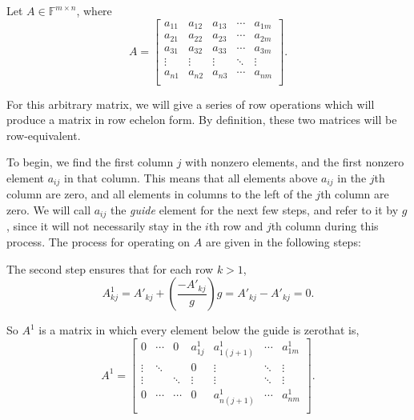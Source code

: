 \documentclass[12pt]{article}
\newcommand{\F}{\mathbb{F}}
\begin{document}
Let $A\in\F^{m\times n}$, where
\[A =
    \begin{bmatrix}
        a_{11} & a_{12} & a_{13} & \cdots & a_{1m} \\
        a_{21} & a_{22} & a_{23} & \cdots & a_{2m} \\
        a_{31} & a_{32} & a_{33} & \cdots & a_{3m} \\
        \vdots & \vdots & \vdots & \ddots & \vdots \\
        a_{n1} & a_{n2} & a_{n3} & \cdots & a_{nm} \\
    \end{bmatrix}
.\]

For this arbitrary matrix, we will give a series of row operations which will produce a matrix in row echelon form. By definition, these two matrices will be row-equivalent. 

To begin, we find the first column $j$ with nonzero elements, and the first nonzero element $a_{ij}$ in that column. This means that all elements above $a_{ij}$ in the $j$th column are zero, and all elements in columns to the left of the $j$th column are zero. We will call $a_{ij}$ the \emph{guide} element for the next few steps, and refer to it by $g$, since it will not necessarily stay in the $i$th row and $j$th column during this process. The process for operating on $A$ are given in the following steps:

\vspace{1em}
\noindent
{}\vspace{1em}

The second step ensures that for each row $k>1$,
\[A^1_{kj} = A'_{kj} + \left(\frac{-A'_{kj}}{g}\right)g = A'_{kj} - A'_{kj} = 0.\]

So $A^1$ is a matrix in which every element below the guide is zero\textemdash that is,
\[A^1 =
    \begin{bmatrix}
        0      & \cdots & 0      & a^1_{1j} & a^1_{1(j+1)}  & \cdots & a^1_{1m}  \\
        \vdots & \ddots &        & 0      & \vdots      & \ddots & \vdots  \\
        \vdots &        & \ddots & \vdots & \vdots      & \ddots & \vdots  \\
        0      & \cdots & \cdots & 0      & a^1_{n(j+1)} & \cdots & a^1_{nm} \\
    \end{bmatrix}
.\]
\end{document}
